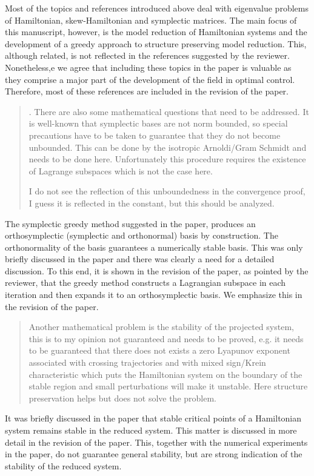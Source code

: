 \documentclass[a4paper]{article}
\newcommand{\breview}{\begin{quotation}\begin{bf}\noindent}
\newcommand{\ereview}{\end{bf}\end{quotation}}
\begin{document}
Most of the topics and references introduced above deal with eigenvalue problems of Hamiltonian, skew-Hamiltonian and symplectic matrices. The main focus of this manuscript, however, is the model reduction of Hamiltonian systems and the development of a greedy approach to structure preserving model reduction. This, although related, is not reflected in the references suggested by the reviewer. Nonetheless,e we agree that including these topics in the paper is valuable as they comprise a major part of the development of the field in optimal control. Therefore, most of these references are included in the revision of the paper.

\breview
2. There are also some mathematical questions that need to be addressed. It is well-known that symplectic bases are not norm bounded, so special precautions have to be taken to guarantee that they do not become unbounded. This can be done by the isotropic Arnoldi/Gram Schmidt and needs to be done here. Unfortunately this procedure requires the existence of Lagrange subspaces which is not the case here.

I do not see the reflection of this unboundedness in the convergence proof, I guess it is reflected in the constant, but this should be analyzed. 
\ereview
The symplectic greedy method suggested in the paper, produces an orthosymplectic (symplectic and orthonormal) basis by construction. The orthonormality of the basis guarantees a numerically stable basis. This was only briefly discussed in the paper and there was clearly a need for a detailed discussion. To this end, it is shown in the revision of the paper, as pointed by the reviewer, that the greedy method constructs a Lagrangian subspace in each iteration and then expands it to an orthosymplectic basis. We emphasize this in the revision of the paper.

\breview
Another mathematical problem is the stability of the projected system, this is to my opinion not guaranteed and needs to be proved, e.g. it needs to be guaranteed that there does not exists a zero Lyapunov exponent associated with crossing trajectories and with mixed sign/Krein characteristic which puts the Hamiltonian system on the boundary of the stable region and small perturbations will make it unstable. Here structure preservation helps but does not solve the problem.
\ereview

It was briefly discussed in the paper that stable critical points of a Hamiltonian system remains stable in the reduced system. This matter is discussed in more detail in the revision of the paper. This, together with the numerical experiments in the paper, do not guarantee general stability, but are strong indication of the stability of the reduced system.
\end{document}
